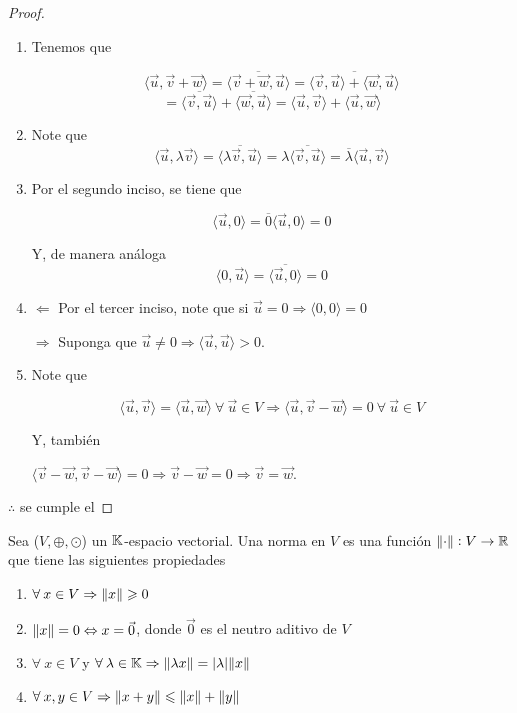 \begin{proof}
    \begin{enumerate}
        \item  Tenemos que

        $$\langle \vec{u}, \vec{v}+\vec{w} \rangle =\overline{\langle \vec{v}+ \vec{w}, \vec{u} \rangle}=\overline{ \langle \vec{v}, \vec{u} \rangle + \langle \vec{w}, \vec{u} \rangle} $$
        $$= \overline{\langle \vec{v}, \vec{u} \rangle} + \overline{\langle \vec{w}, \vec{u} \rangle}=\langle \vec{u}, \vec{v} \rangle+ \langle \vec{u}, \vec{w} \rangle$$

        \item Note que
        $$\langle \vec{u}, \lambda \vec{v} \rangle=\overline{\langle \lambda \vec{v}, \vec{u} \rangle}=\lambda \overline{ \langle \vec{v}, \vec{u} \rangle}=\overline{\lambda} \langle \vec{u}, \vec{v} \rangle$$

        \item Por el segundo inciso, se tiene que

        $$\langle \vec{u}, 0 \rangle=\overline{0} \langle \vec{u}, 0 \rangle=0$$

        Y, de manera análoga
        $$\langle 0, \vec{u} \rangle=\overline{\langle \vec{u}, 0 \rangle}=0$$

        \item $\Leftarrow$ Por el tercer inciso, note que  si $\vec{u}=0 \Rightarrow \langle 0,0 \rangle=0$

        $\Rightarrow$ Suponga que $\vec{u}\neq 0 \Rightarrow \langle \vec{u}, \vec{u} \rangle > 0$.

        \item Note que

        $$\langle \vec{u}, \vec{v} \rangle = \langle \vec{u}, \vec{w} \rangle \: \forall \: \vec{u} \in V \Rightarrow \langle \vec{u}, \vec{v}- \vec{w} \rangle = 0 \: \forall \: \vec{u} \in V$$

        Y, también

        $\langle \vec{v}-\vec{w}, \vec{v}- \vec{w} \rangle =0 \Rightarrow \vec{v}-\vec{w}=0 \Rightarrow \vec{v}=\vec{w}$. 
    \end{enumerate}
    $\therefore$ se cumple el 
\end{proof}


\begin{definition}[Norma]
    Sea  ($V, \oplus, \odot$) un $\mathbb{K}$-espacio vectorial. Una norma en $V$ es una función $\norm{\cdot} : V \to \mathbb{R}$ que tiene las siguientes propiedades
    \begin{enumerate}[label=(\subscript{N}{{\arabic*}})]
    \item $\forall \: x \in V \Rightarrow \norm{x} \geqslant 0$
    \item $\norm{x} = 0 \Leftrightarrow x = \vec{0}$, donde $\vec{0}$ es el neutro aditivo de $V$
    \item $\forall \: x \in V$ y $\forall \: \lambda \in \mathbb{K} \Rightarrow \norm{\lambda x} = \abs{\lambda} \norm{x}$
    \item $\forall \: x,y \in V \Rightarrow \norm{x+y} \leqslant \norm{x} + \norm{y}$
    \end{enumerate}
\end{definition}


